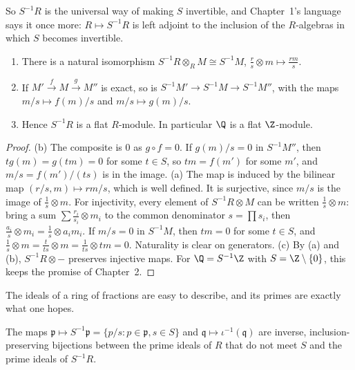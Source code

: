 So $S^{-1}R$ is the universal way of making $S$ invertible, and Chapter~1's language says it once more: $R\mapsto S^{-1}R$ is left adjoint to the inclusion of the $R$-algebras in which $S$ becomes invertible.

\begin{proposition}\label{prop:locexact}
\leavevmode
\begin{enumerate}[label=(\alph*)]
\item There is a natural isomorphism $S^{-1}R\otimes_RM\cong S^{-1}M$, $\frac rs\otimes m\mapsto\frac{rm}s$.
\item If $M'\xrightarrow fM\xrightarrow gM''$ is exact, so is $S^{-1}M'\to S^{-1}M\to S^{-1}M''$, with the maps $m/s\mapsto f(m)/s$ and $m/s\mapsto g(m)/s$.
\item Hence $S^{-1}R$ is a flat $R$-module. In particular $\Q$ is a flat $\Z$-module.
\end{enumerate}
\end{proposition}

\begin{proof}
(b) The composite is $0$ as $g\circ f=0$. If $g(m)/s=0$ in $S^{-1}M''$, then $tg(m)=g(tm)=0$ for some $t\in S$, so $tm=f(m')$ for some $m'$, and $m/s=f(m')/(ts)$ is in the image.
(a) The map is induced by the bilinear map $(r/s,m)\mapsto rm/s$, which is well defined. It is surjective, since $m/s$ is the image of $\frac1s\otimes m$. For injectivity, every element of $S^{-1}R\otimes M$ can be written
$\frac1s\otimes m$: bring a sum $\sum\frac{r_i}{s_i}\otimes m_i$ to the common denominator $s=\prod s_i$, then $\frac{a_i}s\otimes m_i=\frac1s\otimes a_im_i$. If $m/s=0$ in $S^{-1}M$, then $tm=0$ for some $t\in S$, and
$\frac1s\otimes m=\frac t{ts}\otimes m=\frac1{ts}\otimes tm=0$. Naturality is clear on generators.
(c) By (a) and (b), $S^{-1}R\otimes-$ preserves injective maps. For $\Q=S^{-1}\Z$ with $S=\Z\setminus\{0\}$, this keeps the promise of Chapter~2.
\end{proof}

The ideals of a ring of fractions are easy to describe, and its primes are exactly what one hopes.

\begin{theorem}\label{thm:locprimes}
The maps $\mathfrak p\mapsto S^{-1}\mathfrak p=\{p/s:p\in\mathfrak p,s\in S\}$ and $\mathfrak q\mapsto\iota^{-1}(\mathfrak q)$ are inverse, inclusion-preserving bijections between the prime ideals of $R$ that do not meet $S$ and the prime
ideals of $S^{-1}R$.
\end{theorem}


